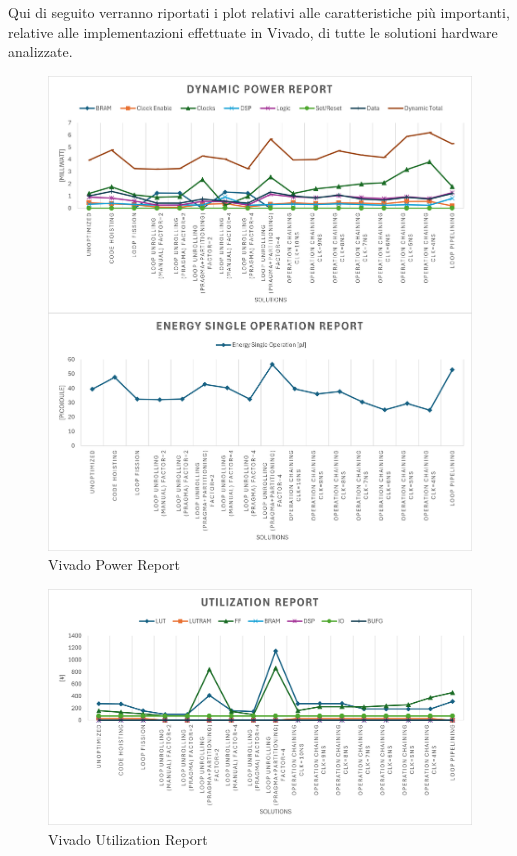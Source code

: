 Qui di seguito verranno riportati i plot relativi alle caratteristiche più importanti, relative alle implementazioni effettuate in Vivado, di tutte le solutioni hardware analizzate.

\begin{figure}[H]
    \centering
    \includegraphics[width=0.7\textheight]{conclusions/powerreport.png}
    \caption{Vivado Power Report}
    \label{fig:vivado-power-report}
\end{figure}

\begin{figure}[H]
	\centering
	\includegraphics[width=0.7\textheight]{conclusions/utilization.png}
	\caption{Vivado Utilization Report}
	\label{fig:vivado-utilization-report}
\end{figure}

